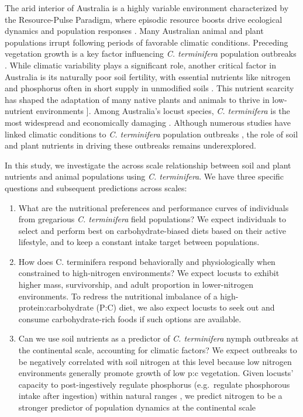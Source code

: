 \documentclass[
]{article}
\begin{document}
The arid interior of Australia is a highly variable environment
\citep{morton_fresh_2011} characterized by the Resource-Pulse Paradigm,
where episodic resource boosts drive ecological dynamics and population
responses \citep{noy-meir_desert_1974, whitford_ecology_2002}. Many
Australian animal and plant populations irrupt following periods of
favorable climatic conditions. Preceding vegetation growth is a key
factor influencing \emph{C. terminifera} population outbreaks
\citep{lawton_seeing_2022}. While climatic variability plays a
significant role, another critical factor in Australia is its naturally
poor soil fertility, with essential nutrients like nitrogen and
phosphorus often in short supply in unmodified soils
\citep{morton_fresh_2011, orians_ecology_2007}. This nutrient scarcity
has shaped the adaptation of many native plants and animals to thrive in
low-nutrient environments \citep{orians_ecology_2007}{]}. Among
Australia's locust species, \emph{C. terminifera} is the most widespread
and economically damaging \citep{hunter_adaptations_2001}. Although
numerous studies have linked climatic conditions to \emph{C.
terminifera} population outbreaks
\citep{clark_influence_1974, deveson_not_2005, farrow_population_1982, key_general_1945},
the role of soil and plant nutrients in driving these outbreaks remains
underexplored.

In this study, we investigate the across scale relationship between soil
and plant nutrients and animal populations using \emph{C. terminifera}.
We have three specific questions and subsequent predictions across
scales:

\begin{enumerate}
\def\labelenumi{\arabic{enumi}.}
\item
  What are the nutritional preferences and performance curves of
  individuals from gregarious \emph{C. terminifera} field populations?
  We expect individuals to select and perform best on
  carbohydrate-biased diets based on their active lifestyle, and to keep
  a constant intake target between populations.
\item
  How does C. terminifera respond behaviorally and physiologically when
  constrained to high-nitrogen environments? We expect locusts to
  exhibit higher mass, survivorship, and adult proportion in
  lower-nitrogen environments. To redress the nutritional imbalance of a
  high-protein:carbohydrate (P:C) diet, we also expect locusts to seek
  out and consume carbohydrate-rich foods if such options are available.
\item
  Can we use soil nutrients as a predictor of \emph{C. terminifera}
  nymph outbreaks at the continental scale, accounting for climatic
  factors? We expect outbreaks to be negatively correlated with soil
  nitrogen at this level because low nitrogen environments generally
  promote growth of low p:c vegetation. Given locusts' capacity to
  post-ingestively regulate phosphorus (e.g.~regulate phosphorous intake
  after ingestion) within natural ranges
  \citep{cease_dietary_2016, zhang_grasshoppers_2014}, we predict
  nitrogen to be a stronger predictor of population dynamics at the
  continental scale
\end{enumerate}
\end{document}
